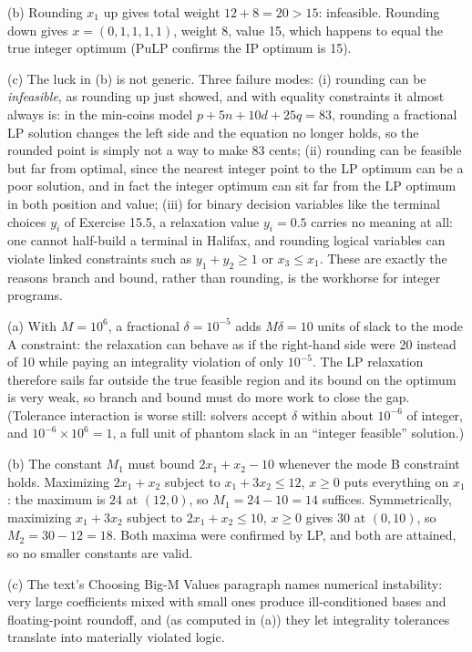 (b) Rounding $x_1$ up gives total weight $12 + 8 = 20 > 15$: infeasible. Rounding down gives $x = (0,1,1,1,1)$, weight 8, value 15, which happens to equal the true integer optimum (PuLP confirms the IP optimum is 15).

(c) The luck in (b) is not generic. Three failure modes: (i) rounding can be \emph{infeasible}, as rounding up just showed, and with equality constraints it almost always is: in the min-coins model $p + 5n + 10d + 25q = 83$, rounding a fractional LP solution changes the left side and the equation no longer holds, so the rounded point is simply not a way to make 83 cents; (ii) rounding can be feasible but far from optimal, since the nearest integer point to the LP optimum can be a poor solution, and in fact the integer optimum can sit far from the LP optimum in both position and value; (iii) for binary decision variables like the terminal choices $y_i$ of Exercise 15.5, a relaxation value $y_i = 0.5$ carries no meaning at all: one cannot half-build a terminal in Halifax, and rounding logical variables can violate linked constraints such as $y_1 + y_2 \geq 1$ or $x_3 \leq x_1$. These are exactly the reasons branch and bound, rather than rounding, is the workhorse for integer programs.


(a) With $M = 10^6$, a fractional $\delta = 10^{-5}$ adds $M\delta = 10$ units of slack to the mode A constraint: the relaxation can behave as if the right-hand side were 20 instead of 10 while paying an integrality violation of only $10^{-5}$. The LP relaxation therefore sails far outside the true feasible region and its bound on the optimum is very weak, so branch and bound must do more work to close the gap. (Tolerance interaction is worse still: solvers accept $\delta$ within about $10^{-6}$ of integer, and $10^{-6} \times 10^6 = 1$, a full unit of phantom slack in an ``integer feasible'' solution.)

(b) The constant $M_1$ must bound $2x_1 + x_2 - 10$ whenever the mode B constraint holds. Maximizing $2x_1 + x_2$ subject to $x_1 + 3x_2 \leq 12$, $x \geq 0$ puts everything on $x_1$: the maximum is $24$ at $(12, 0)$, so $M_1 = 24 - 10 = 14$ suffices. Symmetrically, maximizing $x_1 + 3x_2$ subject to $2x_1 + x_2 \leq 10$, $x \geq 0$ gives $30$ at $(0, 10)$, so $M_2 = 30 - 12 = 18$. Both maxima were confirmed by LP, and both are attained, so no smaller constants are valid.

(c) The text's Choosing Big-M Values paragraph names numerical instability: very large coefficients mixed with small ones produce ill-conditioned bases and floating-point roundoff, and (as computed in (a)) they let integrality tolerances translate into materially violated logic.

